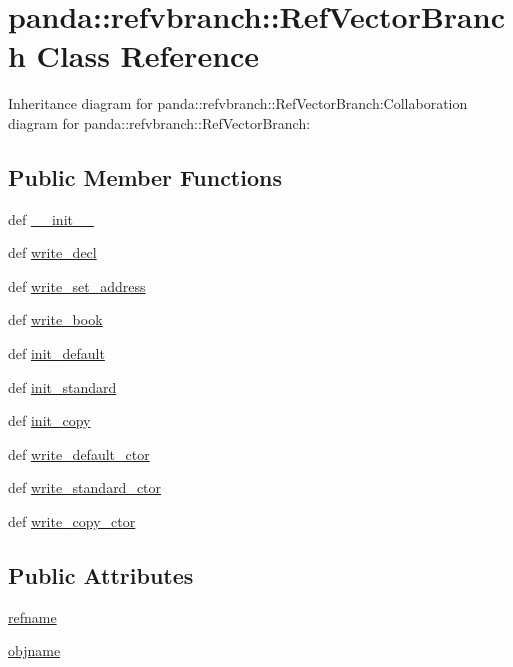 \hypertarget{classpanda_1_1refvbranch_1_1RefVectorBranch}{
\section{panda::refvbranch::RefVectorBranch Class Reference}
\label{classpanda_1_1refvbranch_1_1RefVectorBranch}
}
Inheritance diagram for panda::refvbranch::RefVectorBranch:Collaboration diagram for panda::refvbranch::RefVectorBranch:\subsection*{Public Member Functions}
\begin{DoxyCompactItemize}
\item 
def \hyperlink{classpanda_1_1refvbranch_1_1RefVectorBranch_a31cb3ec50dabb41f9e16d2a4ed97688c}{\_\-\_\-init\_\-\_\-}
\item 
def \hyperlink{classpanda_1_1refvbranch_1_1RefVectorBranch_a8d1f936c35c293b5b0b8d1fdf19b4594}{write\_\-decl}
\item 
def \hyperlink{classpanda_1_1refvbranch_1_1RefVectorBranch_aceefab38bff3bb51a1c19ee337ee85a3}{write\_\-set\_\-address}
\item 
def \hyperlink{classpanda_1_1refvbranch_1_1RefVectorBranch_aaa050ccde603b9c6e1486ab1cabf2586}{write\_\-book}
\item 
def \hyperlink{classpanda_1_1refvbranch_1_1RefVectorBranch_a0552ee354e3a369c54081332ec0d82c2}{init\_\-default}
\item 
def \hyperlink{classpanda_1_1refvbranch_1_1RefVectorBranch_acd2b5cd29c687745c44b5be9dd724f72}{init\_\-standard}
\item 
def \hyperlink{classpanda_1_1refvbranch_1_1RefVectorBranch_a68089f2e817a0029f199ace3a39efe25}{init\_\-copy}
\item 
def \hyperlink{classpanda_1_1refvbranch_1_1RefVectorBranch_a0e04a132b9ac6ed82fa5d64a6067385a}{write\_\-default\_\-ctor}
\item 
def \hyperlink{classpanda_1_1refvbranch_1_1RefVectorBranch_ac40b5ad9dc346749a358a5c62573fac2}{write\_\-standard\_\-ctor}
\item 
def \hyperlink{classpanda_1_1refvbranch_1_1RefVectorBranch_ac778068a381fc7125457161cbc612be4}{write\_\-copy\_\-ctor}
\end{DoxyCompactItemize}
\subsection*{Public Attributes}
\begin{DoxyCompactItemize}
\item 
\hyperlink{classpanda_1_1refvbranch_1_1RefVectorBranch_a8e7b0608a2a3ceb9fa391569d5cf5de4}{refname}
\item 
\hyperlink{classpanda_1_1refvbranch_1_1RefVectorBranch_a4d655d2ab5cb217783a5090942a99240}{objname}
\end{DoxyCompactItemize}
